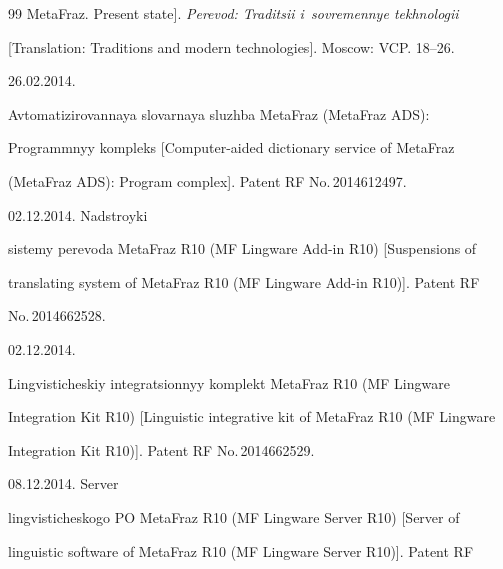 {{\begin{thebibliography}{99}
MetaFraz. Present state]. \textit{Perevod: Traditsii i~sovremennye tekhnologii} 


[Translation: Traditions and modern technologies]. Moscow: VCP. 18--26.










 26.02.2014. 


Avtomatizirovannaya slovarnaya sluzhba MetaFraz (MetaFraz ADS): 


Programmnyy kompleks [Computer-aided dictionary service of MetaFraz 


(MetaFraz ADS): Program complex]. Patent RF No.\,2014612497.







 02.12.2014. Nadstroyki  


sistemy perevoda MetaFraz R10 (MF Lingware Add-in R10) [Suspensions of 


translating system of MetaFraz R10 (MF Lingware Add-in R10)]. Patent RF 


No.\,2014662528.







 02.12.2014. 


Lingvisticheskiy integratsionnyy komplekt MetaFraz R10 (MF Lingware 


Integration Kit R10) [Linguistic integrative kit of MetaFraz R10 (MF Lingware 


Integration Kit R10)]. Patent RF No.\,2014662529.







 08.12.2014. Server 


lingvisticheskogo PO MetaFraz R10 (MF Lingware Server R10) [Server of 


linguistic software of MetaFraz R10 (MF Lingware Server R10)]. Patent RF 



\end{thebibliography}}}
